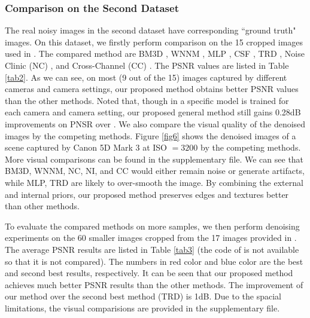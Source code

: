 \documentclass[10pt,twocolumn,letterpaper]{article}
\begin{document}
\subsubsection{Comparison on the Second Dataset \cite{crosschannel2016}}

The real noisy images in the second dataset \cite{crosschannel2016} have corresponding ``ground truth" images. On this dataset, we firstly perform comparison on the 15 cropped images used in \cite{crosschannel2016}. The compared method are BM3D \cite{bm3d}, WNNM \cite{wnnm}, MLP \cite{mlp}, CSF \cite{csf}, TRD \cite{chen2015learning}, Noise Clinic (NC) \cite{noiseclinic}, and Cross-Channel (CC) \cite{crosschannel2016}. The PSNR values are listed in Table \ref{tab2}. As we can see, on most (9 out of the 15) images captured by different cameras and camera settings, our proposed method obtains better PSNR values than the other methods. Noted that, though in \cite{crosschannel2016} a specific model is trained for each camera and camera setting, our proposed general method still gains 0.28dB improvements on PNSR over \cite{crosschannel2016}. We also compare the visual quality of the denoised images by the competing methods. Figure \ref{fig6} shows the denoised images of a scene captured by Canon 5D Mark 3 at ISO $=3200$ by the competing methods. More visual comparisons can be found in the supplementary file. We can see that BM3D, WNNM, NC, NI, and CC would either remain noise or generate artifacts, while MLP, TRD are likely to over-smooth the image. By combining the external and internal priors, our proposed method preserves edges and textures better than other methods. 

To evaluate the compared methods on more samples, we then perform denoising experiments on the 60 smaller images cropped from the 17 images provided in \cite{crosschannel2016}. The average PSNR results are listed in Table \ref{tab3} (the code of \cite{crosschannel2016} is not available so that it is not compared). The numbers in red color and blue color are the best and second best results, respectively. It can be seen that our proposed method achieves much better PSNR results than the other methods. The improvement of our method over the second best method (TRD) is 1dB. Due to the spacial limitations, the visual comparisions are provided in the supplementary file.
\end{document}
